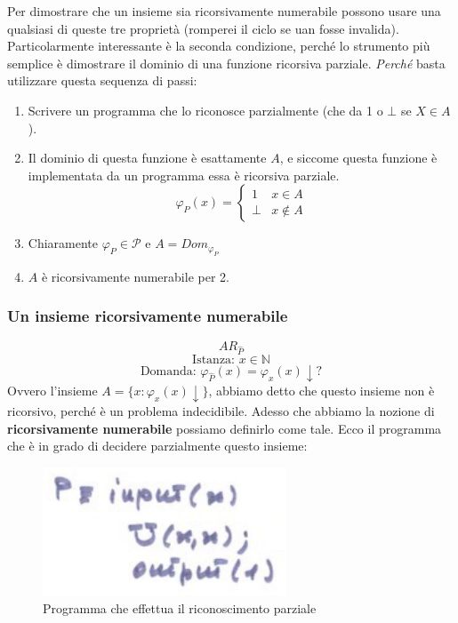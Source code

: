 \documentclass{article}
\begin{document}
Per dimostrare che un insieme sia ricorsivamente numerabile possono usare una qualsiasi
di queste tre proprietà (romperei il ciclo se uan fosse invalida). Particolarmente
interessante è la seconda condizione, perché lo strumento più semplice è dimostrare il dominio
di una funzione ricorsiva parziale. \textit{Perché} basta utilizzare questa sequenza di passi:
\begin{enumerate}
    \item Scrivere un programma che lo riconosce parzialmente (che da 1 o $\bot$ se $X\in A$).
    \item Il dominio di questa funzione è esattamente $A$, e siccome questa funzione è implementata
          da un programma essa è ricorsiva parziale.
          \[
              \varphi_P(x)=
              \begin{cases}
                  1    & x\in A    \\
                  \bot & x\notin A
              \end{cases}
          \]
    \item Chiaramente $\varphi_P\in\mathcal{P}$ e $A=Dom_{\varphi_P}$
    \item $A$ è ricorsivamente numerabile per 2.
\end{enumerate}

\subsubsection{Un insieme ricorsivamente numerabile}
$$AR_{\hat{P}}$$
$$\text{Istanza: }x\in\mathbb{N}$$
$$\text{Domanda: }\varphi_{\hat{P}}(x)=\varphi_x(x)\downarrow?$$
Ovvero l'insieme $A=\{x:\varphi_x(x)\downarrow\}$, abbiamo detto che questo insieme non è ricorsivo,
perché è un problema indecidibile. Adesso che abbiamo la nozione di \textbf{ricorsivamente numerabile}
possiamo definirlo come tale. Ecco il programma che è in grado di decidere parzialmente questo insieme:
\begin{figure}[H]
    \centering
    \includegraphics[]{images/interpuniv.png}
    \caption{Programma che effettua il riconoscimento parziale}
\end{figure}
\end{document}
